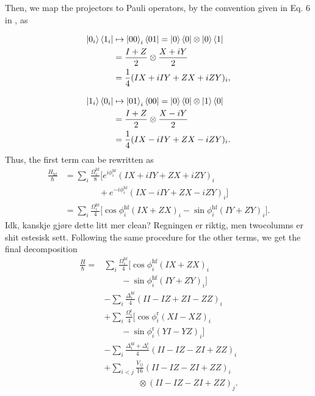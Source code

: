 \documentclass[amssymb,twocolumn,aps]{revtex4-2}
\begin{document}
Then, we map the projectors to Pauli operators, by the convention given in Eq. 6 in \cite{Sawaya2020}, as

\begin{align*}
    \ket{0_i}\bra{1_i}
    &\mapsto \ket{00}_i\bra{01}
    = \ket{0}\bra{0}\otimes\ket{0}\bra{1}\\
    &= \frac{I+Z}{2}\otimes\frac{X+iY}{2}\\
    &= \frac{1}{4}(IX+iIY+ZX+iZY)_i,\\[8pt]
    \ket{1_i}\bra{0_i}
    &\mapsto \ket{01}_i\bra{00}
    = \ket{0}\bra{0}\otimes\ket{1}\bra{0}\\
    &= \frac{I+Z}{2}\otimes\frac{X-iY}{2}\\
    &= \frac{1}{4}(IX-iIY+ZX-iZY)_i.
\end{align*}
Thus, the first term can be rewritten as
\begin{align*}
    \frac{H_{\mathrm{hf}}}{\hbar}
    &= \sum_i \frac{\Omega_i^{\mathrm{hf}}}{8}
    \Big[
    e^{i\phi_i^{\mathrm{hf}}}
    (IX+iIY+ZX+iZY)_i\\
    &\qquad\qquad+
    e^{-i\phi_i^{\mathrm{hf}}}
    (IX-iIY+ZX-iZY)_i
    \Big]\\[6pt]
    &= \sum_i \frac{\Omega_i^{\mathrm{hf}}}{4}
    \Big[
    \cos\phi_i^{\mathrm{hf}}(IX+ZX)_i
    -\sin\phi_i^{\mathrm{hf}}(IY+ZY)_i
    \Big].
\end{align*}
Idk, kanskje gjøre dette litt mer clean? Regningen er riktig, men twocolumns er shit estesisk sett.
Following the same procedure for the other terms, we get the final decomposition
\begin{align*}
    \frac{H}{\hbar}
    ={}&
    \sum_i\frac{\Omega_i^{\mathrm{hf}}}{4}
    \Big[
        \cos\phi_i^{\mathrm{hf}}(IX+ZX)_i\\
    &\qquad
        -\sin\phi_i^{\mathrm{hf}}(IY+ZY)_i
    \Big]\\[4pt]
    &-\sum_i\frac{\Delta_i^{\mathrm{hf}}}{4}
      (II-IZ+ZI-ZZ)_i\\[4pt]
    &+\sum_i\frac{\Omega_i^{\mathrm{r}}}{4}
    \Big[
        \cos\phi_i^{\mathrm{r}}(XI-XZ)_i\\
    &\qquad
        -\sin\phi_i^{\mathrm{r}}(YI-YZ)_i
    \Big]\\[4pt]
    &-\sum_i
      \frac{\Delta_i^{\mathrm{hf}}+\Delta_i^{\mathrm{r}}}{4}
      (II-IZ-ZI+ZZ)_i\\[4pt]
    &+\sum_{i<j}\frac{V_{ij}}{16}
      (II-IZ-ZI+ZZ)_i\\
    &\qquad\qquad\otimes
      (II-IZ-ZI+ZZ)_j.
\end{align*}
\end{document}
